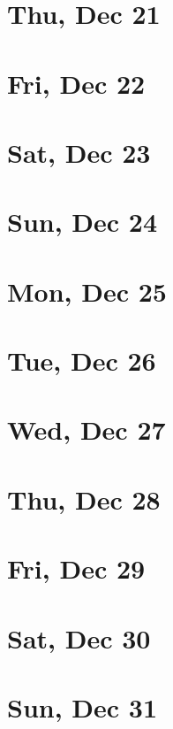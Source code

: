 	\section{Thu, Dec 21}
		
	\section{Fri, Dec 22}
		
	\section{Sat, Dec 23}
		
	\section{Sun, Dec 24}
		
	\section{Mon, Dec 25}
		
	\section{Tue, Dec 26}
		
	\section{Wed, Dec 27}
		
	\section{Thu, Dec 28}
		
	\section{Fri, Dec 29}
		
	\section{Sat, Dec 30}
		
	\section{Sun, Dec 31}
		
